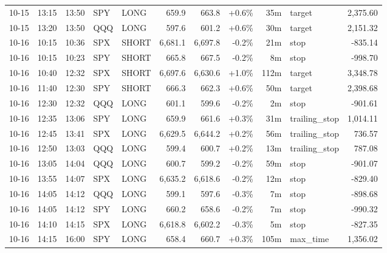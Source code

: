 \documentclass[11pt,a4paper,twoside]{article}
\begin{document}
\begin{center}
\begin{longtable}{>{\color{txtmain}}l l l l l r r r r >{\color{txtmain}}l r}
10-15 & 13:15 & 13:50 & SPY & LONG & 659.9 & 663.8 & \textcolor{wingreen}{+0.6\%} & 35m & target & \textcolor{wingreen}{2,375.60} \\
10-15 & 13:20 & 13:50 & QQQ & LONG & 597.6 & 601.2 & \textcolor{wingreen}{+0.6\%} & 30m & target & \textcolor{wingreen}{2,151.32} \\
10-16 & 10:15 & 10:36 & SPX & SHORT & 6,681.1 & 6,697.8 & \textcolor{lossred}{-0.2\%} & 21m & stop & \textcolor{lossred}{-835.14} \\
10-16 & 10:15 & 10:23 & SPY & SHORT & 665.8 & 667.5 & \textcolor{lossred}{-0.2\%} & 8m & stop & \textcolor{lossred}{-998.70} \\
10-16 & 10:40 & 12:32 & SPX & SHORT & 6,697.6 & 6,630.6 & \textcolor{wingreen}{+1.0\%} & 112m & target & \textcolor{wingreen}{3,348.78} \\
10-16 & 11:40 & 12:30 & SPY & SHORT & 666.3 & 662.3 & \textcolor{wingreen}{+0.6\%} & 50m & target & \textcolor{wingreen}{2,398.68} \\
10-16 & 12:30 & 12:32 & QQQ & LONG & 601.1 & 599.6 & \textcolor{lossred}{-0.2\%} & 2m & stop & \textcolor{lossred}{-901.61} \\
10-16 & 12:35 & 13:06 & SPY & LONG & 659.9 & 661.6 & \textcolor{wingreen}{+0.3\%} & 31m & trailing\_stop & \textcolor{wingreen}{1,014.11} \\
10-16 & 12:45 & 13:41 & SPX & LONG & 6,629.5 & 6,644.2 & \textcolor{wingreen}{+0.2\%} & 56m & trailing\_stop & \textcolor{wingreen}{736.57} \\
10-16 & 12:50 & 13:03 & QQQ & LONG & 599.4 & 600.7 & \textcolor{wingreen}{+0.2\%} & 13m & trailing\_stop & \textcolor{wingreen}{787.08} \\
10-16 & 13:05 & 14:04 & QQQ & LONG & 600.7 & 599.2 & \textcolor{lossred}{-0.2\%} & 59m & stop & \textcolor{lossred}{-901.07} \\
10-16 & 13:55 & 14:07 & SPX & LONG & 6,635.2 & 6,618.6 & \textcolor{lossred}{-0.2\%} & 12m & stop & \textcolor{lossred}{-829.40} \\
10-16 & 14:05 & 14:12 & QQQ & LONG & 599.1 & 597.6 & \textcolor{lossred}{-0.3\%} & 7m & stop & \textcolor{lossred}{-898.68} \\
10-16 & 14:05 & 14:12 & SPY & LONG & 660.2 & 658.6 & \textcolor{lossred}{-0.2\%} & 7m & stop & \textcolor{lossred}{-990.32} \\
10-16 & 14:10 & 14:15 & SPX & LONG & 6,618.8 & 6,602.2 & \textcolor{lossred}{-0.3\%} & 5m & stop & \textcolor{lossred}{-827.35} \\
10-16 & 14:15 & 16:00 & SPY & LONG & 658.4 & 660.7 & \textcolor{wingreen}{+0.3\%} & 105m & max\_time & \textcolor{wingreen}{1,356.02} \\

\end{longtable}
\end{center}
\end{document}
